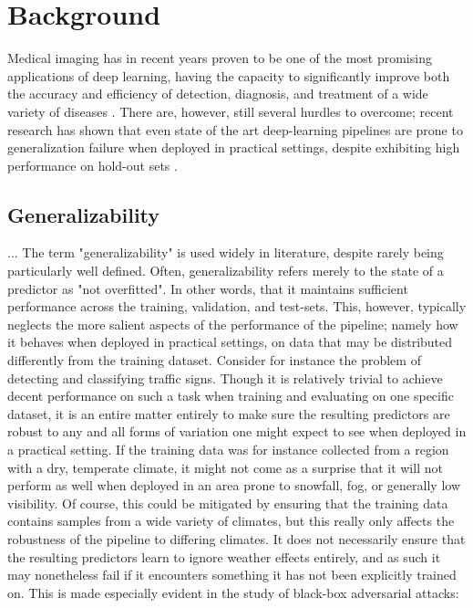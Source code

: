 \chapter{Background}
\setcounter{chapter}{2}
Medical imaging has in recent years proven to be one of the most promising applications of deep learning, having the capacity to significantly improve both the accuracy and efficiency of detection, diagnosis, and treatment of a wide variety of diseases \cite{dl_medical_imaging}.  There are, however, still several hurdles to overcome; recent research has shown that even state of the art deep-learning pipelines are prone to generalization failure when deployed in practical settings, despite exhibiting high performance on hold-out sets \cite{retinopathy, damour2020underspecification}. %
\section{Generalizability}
	        ...
	The term "generalizability" is used widely in literature, despite rarely being particularly well defined. Often, generalizability refers merely to the state of a predictor as "not overfitted". In other words, that it maintains sufficient performance across the training, validation, and test-sets. This, however, typically neglects the more salient aspects of the performance of the pipeline; namely how it behaves when deployed in practical settings, on data that may be distributed differently from the training dataset. Consider for instance the problem of detecting and classifying traffic signs. Though it is relatively trivial to achieve decent performance on such a task when training and evaluating on one specific dataset, it is an entire matter entirely to make sure the resulting predictors are robust to any and all forms of variation one might expect to see when deployed in a practical setting. If the training data was for instance collected from a region with a dry, temperate climate, it might not come as a surprise that it will not perform as well when deployed in an area prone to snowfall, fog, or generally low visibility. Of course, this could be mitigated by ensuring that the training data contains samples from a wide variety of climates, but this really only affects the robustness of the pipeline to differing climates. It does not necessarily ensure that the resulting predictors learn to ignore weather effects entirely, and as such it may nonetheless fail if it encounters something it has not been explicitly trained on. This is made especially evident in the study of black-box adversarial attacks: %
	        
